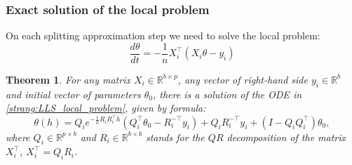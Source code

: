 \documentclass{article}
\newtheorem{theorem}{Theorem}
\begin{document}
\subsubsection{Exact solution of the local problem}
On each splitting approximation step we need to solve the local problem:
\begin{equation}\label{strang:LLS_local_problem}
\frac{d \theta}{d t} = - \frac{1}{n} X_i^\top( X_i \theta - y_i)
\end{equation}
\begin{theorem}\label{strang:LLS_local_solution} For any matrix $X_i \in \mathbb{R}^{b \times p}$, any vector of right-hand side $y_i \in \mathbb{R}^{b}$ and initial vector of parameters $\theta_0$, there is a solution of the ODE in \ref{strang:LLS_local_problem}, given by formula:
$$
\theta(h) = Q_i e^{-\frac{1}{n}R_iR_i^\top h} \left( Q_i^\top \theta_0 - R_i^{-\top}y_i\right) + Q_iR_i^{-\top}y_i + (I - Q_iQ_i^\top)\theta_0,
$$ 
where $Q_i \in \mathbb{R}^{p \times b}$ and $R_i \in \mathbb{R}^{b \times b}$ stands for the $QR$ decomposition of the matrix $X_i^\top$, $X_i^\top = Q_i R_i$.
\end{theorem}
\end{document}
